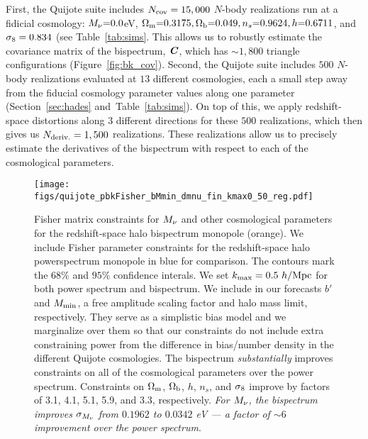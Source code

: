 First, the Quijote suite includes $N_{\rm cov} = 15,000$ $N$-body realizations run at a 
fidicial cosmology: $M_\nu{=}0.0$eV, $\Omega_{\rm m}{=}0.3175, \Omega_{\rm b}{=}0.049, 
n_s{=}0.9624, h{=}0.6711$, and $\sigma_8=0.834$ (see Table~\ref{tab:sims}. 
This allows us to robustly estimate the covariance matrix of the bispectrum, 
$\textbf{\textit{C}}$, which has ${\sim}1,800$ triangle configurations 
(Figure~\ref{fig:bk_cov}). Second, the Quijote suite includes $500$ $N$-body 
realizations evaluated at $13$ different cosmologies, each a small step away 
from the fiducial cosmology parameter values along one parameter 
(Section~\ref{sec:hades} and~Table~\ref{tab:sims}). On top of this, we apply 
redshift-space distortions along 3 different directions for these $500$ 
realizations, which then gives us $N_{\rm deriv.} = 1,500$ realizations. 
These realizations allow us to precisely estimate the derivatives of the 
bispectrum with respect to each of the cosmological parameters. 

\begin{figure}
\begin{center}
    \texttt{[image: figs/quijote\_pbkFisher\_bMmin\_dmnu\_fin\_kmax0\_50\_reg.pdf]} 
    \caption{Fisher matrix constraints for $M_\nu$ and other cosmological parameters 
        for the redshift-space halo bispectrum monopole (orange). We include Fisher
        parameter constraints for the redshift-space halo powerspectrum monopole in blue 
        for comparison. The contours mark the $68\%$ and $95\%$ confidence interals. 
        We set $k_{\rm max} = 0.5~h/{\rm Mpc}$ for both power spectrum and bispectrum. 
        We include in our forecasts $b'$ and $M_{\rm min}$, a free amplitude scaling 
        factor and halo mass limit, respectively. They serve as a simplistic bias model 
        and we marginalize over them so that our constraints do not include extra 
        constraining power from the difference in bias/number density in the different 
        Quijote cosmologies. The bispectrum {\em substantially} improves constraints on all of the cosmological 
        parameters over the power spectrum. Constraints on $\Omega_{\rm m}$, $\Omega_{\rm b}$, $h$, $n_s$, and $\sigma_8$
        improve by factors of 3.1, 4.1, 5.1, 5.9, and 3.3, respectively. {\em For $M_\nu$, the
        bispectrum improves $\sigma_{M_\nu}$ from $0.1962$ to $0.0342$ eV --- a factor 
        of ${\sim}6$ improvement over the power spectrum}.}
\label{fig:bk_fish_05}
\end{center}
\end{figure}

